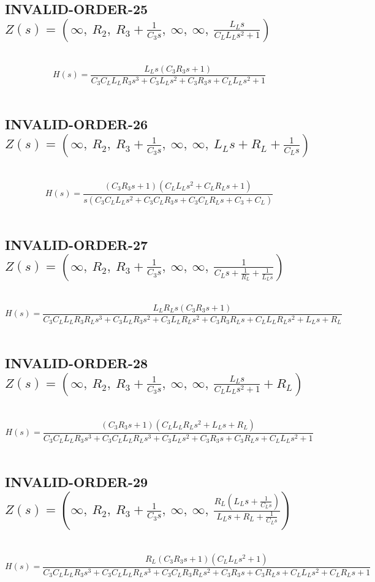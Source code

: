 \documentclass{article}
\begin{document}
\subsection{INVALID-ORDER-25 $Z(s) = \left( \infty, \  R_{2}, \  R_{3} + \frac{1}{C_{3} s}, \  \infty, \  \infty, \  \frac{L_{L} s}{C_{L} L_{L} s^{2} + 1}\right)$ } \ 
\textbf{\[H(s) = \frac{L_{L} s \left(C_{3} R_{3} s + 1\right)}{C_{3} C_{L} L_{L} R_{3} s^{3} + C_{3} L_{L} s^{2} + C_{3} R_{3} s + C_{L} L_{L} s^{2} + 1}\] } \ 
\subsection{INVALID-ORDER-26 $Z(s) = \left( \infty, \  R_{2}, \  R_{3} + \frac{1}{C_{3} s}, \  \infty, \  \infty, \  L_{L} s + R_{L} + \frac{1}{C_{L} s}\right)$ } \ 
\textbf{\[H(s) = \frac{\left(C_{3} R_{3} s + 1\right) \left(C_{L} L_{L} s^{2} + C_{L} R_{L} s + 1\right)}{s \left(C_{3} C_{L} L_{L} s^{2} + C_{3} C_{L} R_{3} s + C_{3} C_{L} R_{L} s + C_{3} + C_{L}\right)}\] } \ 
\subsection{INVALID-ORDER-27 $Z(s) = \left( \infty, \  R_{2}, \  R_{3} + \frac{1}{C_{3} s}, \  \infty, \  \infty, \  \frac{1}{C_{L} s + \frac{1}{R_{L}} + \frac{1}{L_{L} s}}\right)$ } \ 
\textbf{\[H(s) = \frac{L_{L} R_{L} s \left(C_{3} R_{3} s + 1\right)}{C_{3} C_{L} L_{L} R_{3} R_{L} s^{3} + C_{3} L_{L} R_{3} s^{2} + C_{3} L_{L} R_{L} s^{2} + C_{3} R_{3} R_{L} s + C_{L} L_{L} R_{L} s^{2} + L_{L} s + R_{L}}\] } \ 
\subsection{INVALID-ORDER-28 $Z(s) = \left( \infty, \  R_{2}, \  R_{3} + \frac{1}{C_{3} s}, \  \infty, \  \infty, \  \frac{L_{L} s}{C_{L} L_{L} s^{2} + 1} + R_{L}\right)$ } \ 
\textbf{\[H(s) = \frac{\left(C_{3} R_{3} s + 1\right) \left(C_{L} L_{L} R_{L} s^{2} + L_{L} s + R_{L}\right)}{C_{3} C_{L} L_{L} R_{3} s^{3} + C_{3} C_{L} L_{L} R_{L} s^{3} + C_{3} L_{L} s^{2} + C_{3} R_{3} s + C_{3} R_{L} s + C_{L} L_{L} s^{2} + 1}\] } \ 
\subsection{INVALID-ORDER-29 $Z(s) = \left( \infty, \  R_{2}, \  R_{3} + \frac{1}{C_{3} s}, \  \infty, \  \infty, \  \frac{R_{L} \left(L_{L} s + \frac{1}{C_{L} s}\right)}{L_{L} s + R_{L} + \frac{1}{C_{L} s}}\right)$ } \ 
\textbf{\[H(s) = \frac{R_{L} \left(C_{3} R_{3} s + 1\right) \left(C_{L} L_{L} s^{2} + 1\right)}{C_{3} C_{L} L_{L} R_{3} s^{3} + C_{3} C_{L} L_{L} R_{L} s^{3} + C_{3} C_{L} R_{3} R_{L} s^{2} + C_{3} R_{3} s + C_{3} R_{L} s + C_{L} L_{L} s^{2} + C_{L} R_{L} s + 1}\] } \ 
\end{document}
